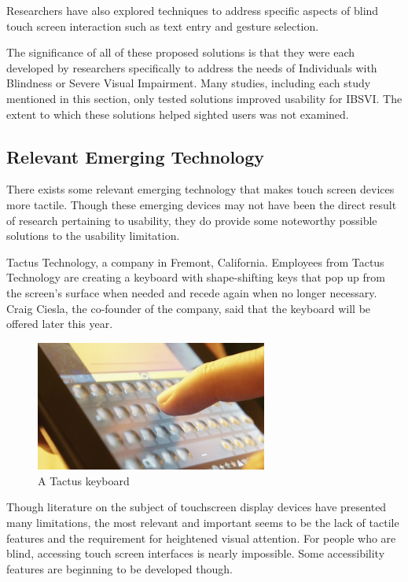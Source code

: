 \documentclass[11pt]{article}
\begin{document}
Researchers have also explored techniques to address specific aspects of blind touch screen interaction such as text entry\cite{Tinwala:2010:ETE:1868914.1868972, Bonner:2010:NNA:2166616.2166649} and gesture selection.\cite{Kane:2011:UGB:1978942.1979001}

The significance of all of these proposed solutions is that they were each developed by researchers specifically to address the needs of Individuals with Blindness or Severe Visual Impairment. Many studies, including each study mentioned in this section, only tested solutions improved usability for IBSVI. The extent to which these solutions helped sighted users was not examined.
  

\subsection{Relevant Emerging Technology}
There exists some relevant emerging technology that makes touch screen devices more tactile. Though these emerging devices may not have been the direct result of research pertaining to usability, they do provide some noteworthy possible solutions to the usability limitation.

Tactus Technology, a company in Fremont, California. Employees from Tactus Technology are creating a keyboard with shape-shifting keys that pop up from the screen's surface when needed and recede again when no longer necessary.\cite{Tactus} Craig Ciesla, the co-founder of the company, said that the keyboard will be offered later this year. 

\begin{figure}[ht]
\centering
\includegraphics[width=3in]{tactus-keyboard.jpg} 
\caption{A Tactus keyboard}
\label{figure-sample}
\end{figure}
Though literature on the subject of touchscreen display devices have presented many limitations, the most relevant and important seems to be the lack of tactile features and the requirement for heightened visual attention. For people who are blind, accessing touch screen interfaces is nearly impossible. Some accessibility features are beginning to be developed though.
\end{document}

